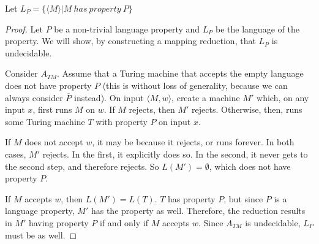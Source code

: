 





Let $L_P = \{ \langle M \rangle | M \ has\ property \ P \}$



\begin{proof}
	
	Let $P$ be a non-trivial language property and $L_P$ be the language of the property.  We will show, by constructing a mapping reduction, that $L_P$ is undecidable.
	
	Consider $A_{TM}$.  Assume that a Turing machine that accepts the empty language does not have property $P$ (this is without loss of generality, because we can always consider $\overline{P}$ instead).  On input $\langle M,w\rangle$, create a machine $M'$ which, on any input $x$, first runs $M$ on $w$.  If $M$ rejects, then $M'$ rejects.  Otherwise, then, runs some Turing machine $T$ with property $P$ on input $x$.
	
	If $M$ does not accept $w$, it may be because it rejects, or runs forever.  In both cases, $M'$ rejects.  In the first, it explicitly does so.  In the second, it never gets to the second step, and therefore rejects.  So $L(M') = \emptyset$, which does not have property $P$.
	
	If $M$ accepts $w$, then $L(M') = L(T)$.  $T$ has property $P$, but since $P$ is a language property, $M'$ has the property as well.  Therefore, the reduction results in $M'$ having property $P$ if and only if $M$ accepts $w$.  Since $A_{TM}$ is undecidable, $L_P$ must be as well.
	
	
	
\end{proof}








